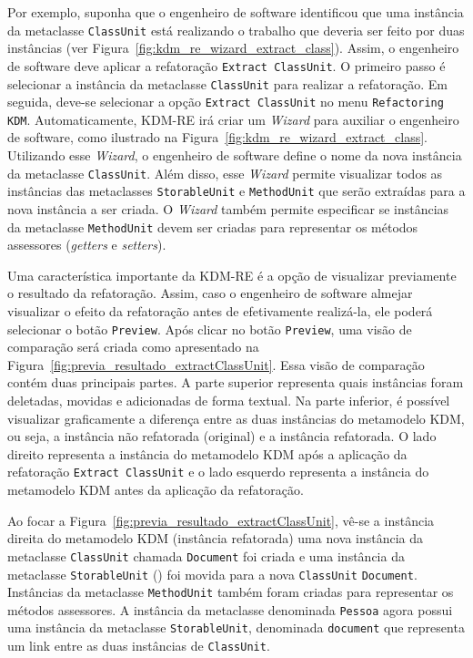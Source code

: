 Por exemplo, suponha que o engenheiro de software identificou que uma instância da metaclasse \texttt{ClassUnit} está realizando o trabalho que deveria ser feito por duas instâncias (ver Figura~\ref{fig:kdm_re_wizard_extract_class}). Assim, o engenheiro de software deve aplicar a refatoração \texttt{Extract ClassUnit}. O primeiro passo é selecionar a instância da metaclasse \texttt{ClassUnit} para realizar a refatoração. Em seguida, deve-se selecionar a opção \texttt{Extract ClassUnit} no menu \texttt{Refactoring KDM}. Automaticamente, KDM-RE irá criar um \textit{Wizard} para auxiliar o engenheiro de software, como ilustrado na Figura~\ref{fig:kdm_re_wizard_extract_class}. Utilizando esse \textit{Wizard}, o engenheiro de software define o nome da nova instância da metaclasse \texttt{ClassUnit}. Além disso, esse \textit{Wizard} permite visualizar todos as instâncias das metaclasses \texttt{StorableUnit} e \texttt{MethodUnit} que serão extraídas para a nova instância a ser criada. O \textit{Wizard} também permite especificar se instâncias da metaclasse \texttt{MethodUnit} devem ser criadas para representar os métodos assessores (\textit{getters} e \textit{setters}). 

Uma característica importante da KDM-RE é a opção de visualizar previamente o resultado da refatoração. Assim, caso o engenheiro de software almejar visualizar o efeito da refatoração antes de efetivamente realizá-la, ele poderá selecionar o botão \texttt{Preview}. Após clicar no botão \texttt{Preview}, uma visão de comparação será criada como apresentado na Figura~\ref{fig:previa_resultado_extractClassUnit}. Essa visão de comparação contém duas principais partes. A parte superior representa quais instâncias foram deletadas, movidas e adicionadas de forma textual. Na parte inferior, é possível visualizar graficamente a diferença entre as duas instâncias do metamodelo KDM, ou seja, a instância não refatorada (original) e a instância refatorada. O lado direito representa a instância do metamodelo KDM após a aplicação da refatoração \texttt{Extract ClassUnit} e o lado esquerdo representa a instância do metamodelo KDM antes da aplicação da refatoração. 

Ao focar a Figura~\ref{fig:previa_resultado_extractClassUnit}, vê-se a instância direita do metamodelo KDM (instância refatorada) uma nova instância da metaclasse \texttt{ClassUnit} chamada \texttt{Document} foi criada e uma instância da metaclasse \texttt{StorableUnit} () foi movida para a nova \texttt{ClassUnit} \texttt{Document}. Instâncias da metaclasse \texttt{MethodUnit} também foram criadas para representar os métodos assessores. A instância da metaclasse denominada \texttt{Pessoa} agora possui uma instância da metaclasse \texttt{StorableUnit}, denominada \texttt{document} que representa um link entre as duas instâncias de \texttt{ClassUnit}.

